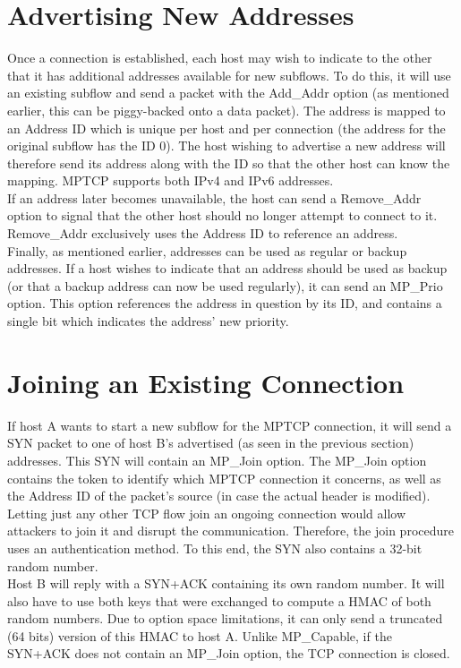 \section{Advertising New Addresses}
Once a connection is established, each host may wish to indicate to the other that it has additional addresses available for new subflows. To do this, it will use an existing subflow and send a packet with the Add\_Addr option (as mentioned earlier, this can be piggy-backed onto a data packet). The address is mapped to an Address ID which is unique per host and per connection (the address for the original subflow has the ID 0). The host wishing to advertise a new address will therefore send its address along with the ID so that the other host can know the mapping. MPTCP supports both IPv4 and IPv6 addresses. \\

If an address later becomes unavailable, the host can send a Remove\_Addr option to signal that the other host should no longer attempt to connect to it. Remove\_Addr exclusively uses the Address ID to reference an address. \\

Finally, as mentioned earlier, addresses can be used as regular or backup addresses. If a host wishes to indicate that an address should be used as backup (or that a backup address can now be used regularly), it can send an MP\_Prio option. This option references the address in question by its ID, and contains a single bit which indicates the address' new priority.

\section{Joining an Existing Connection}
If host A wants to start a new subflow for the MPTCP connection, it will send a SYN packet to one of host B's advertised (as seen in the previous section) addresses. This SYN will contain an MP\_Join option. The MP\_Join option contains the token to identify which MPTCP connection it concerns, as well as the Address ID of the packet's source (in case the actual header is modified). Letting just any other TCP flow join an ongoing connection would allow attackers to join it and disrupt the communication. Therefore, the join procedure uses an authentication method. To this end, the SYN also contains a 32-bit random number. \\

Host B will reply with a SYN+ACK containing its own random number. It will also have to use both keys that were exchanged to compute a HMAC of both random numbers. Due to option space limitations, it can only send a truncated (64 bits) version of this HMAC to host A. Unlike MP\_Capable, if the SYN+ACK does not contain an MP\_Join option, the TCP connection is closed. \\

